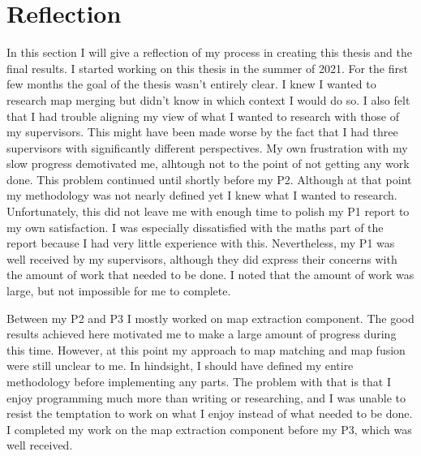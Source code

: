 \section{Reflection}
In this section I will give a reflection of my process in creating this thesis and the final results. I started working on this thesis in the summer of 2021. For the first few months the goal of the thesis wasn't entirely clear. I knew I wanted to research map merging but didn't know in which context I would do so. I also felt that I had trouble aligning my view of what I wanted to research with those of my supervisors. This might have been made worse by the fact that I had three supervisors with significantly different perspectives. My own frustration with my slow progress demotivated me, alhtough not to the point of not getting any work done. This problem continued until shortly before my P2. Although at that point my methodology was not nearly defined yet I knew what I wanted to research. Unfortunately, this did not leave me with enough time to polish my P1 report to my own satisfaction. I was especially dissatisfied with the maths part of the report because I had very little experience with this. Nevertheless, my P1 was well received by my supervisors, although they did express their concerns with the amount of work that needed to be done. I noted that the amount of work was large, but not impossible for me to complete. 

Between my P2 and P3 I mostly worked on map extraction component. The good results achieved here motivated me to make a large amount of progress during this time. However, at this point my approach to map matching and map fusion were still unclear to me. In hindsight, I should have defined my entire methodology before implementing any parts. The problem with that is that I enjoy programming much more than writing or researching, and I was unable to resist the temptation to work on what I enjoy instead of what needed to be done. I completed my work on the map extraction component before my P3, which was well received.

